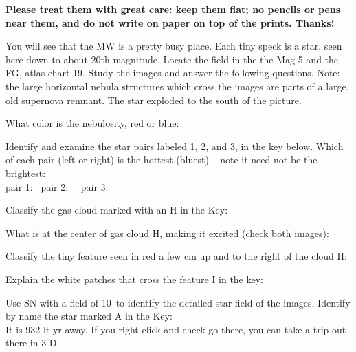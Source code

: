 \medskip
\noindent
{\bf Please treat them with great care: keep them flat; no pencils or
  pens near them, and do not write on paper on top of the
  prints. Thanks!}

\medskip
\noindent
You will see that the MW is a pretty busy place. Each tiny speck is a
star, seen here down to about 20th magnitude. Locate the field in
the the Mag 5 and the FG, atlas chart 19. Study the images and answer
the following questions. Note: the large horizontal nebula structures which
cross the images are parts of a large, old supernova remnant. The star
exploded to the south of the picture.


\bigskip
\noindent
What color is the nebulosity, red or blue: \makebox[4cm]{\hrulefill}

\bigskip
\noindent
Identify and examine the star pairs labeled 1, 2, and 3, in the key
below.
Which of each pair (left or right) is the hottest (bluest) -- note it need not be the
brightest: \\
pair 1: \makebox[4cm]{\hrulefill} \  pair 2: \makebox[4cm]{\hrulefill}
\ \
pair 3:  \makebox[4cm]{\hrulefill}

\bigskip
\noindent
Classify the gas cloud marked with an H in the Key:  \makebox[4cm]{\hrulefill}

\bigskip
\noindent
What is at the center of gas cloud H, making it excited (check both images): 
\makebox[4cm]{\hrulefill}

\bigskip
\noindent
Classify the tiny feature seen in red a few cm up and to the right of
the cloud H:   \makebox[4cm]{\hrulefill}

\bigskip
\noindent
Explain the white patches that cross the feature I in the key: \makebox[4cm]{\hrulefill}


\bigskip
\noindent
Use SN with a field of 10\deg\ to identify the detailed star field of the
images.  Identify by name the star marked A in the Key:
\makebox[4cm]{\hrulefill} \\
It is 932 lt yr away. If you right click and check go there,
you can take a trip out there in 3-D.


\begin{figure*}[h]
        \centerline{}
        \caption{}
         \end{figure*}




